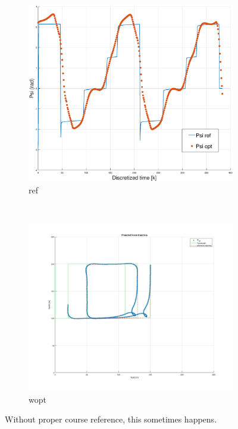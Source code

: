 \clearpage
\begin{figure}[!ht] %
    \centering
    \begin{subfigure}{0.90\textwidth}
        \includegraphics[width=\textwidth]{Images/Figures/Extra_Stuff/WrapTo2Pi_problem_Ref}
        \caption{ref}
    \end{subfigure}
    \hfill
    \\
    \begin{subfigure}{0.90\textwidth}
        \includegraphics[width=\textwidth]{Images/Figures/Extra_Stuff/WrapTo2Pi_problem_Wopt}
        \caption{wopt}
    \end{subfigure}
    \caption{Without proper course reference, this sometimes happens.}
\end{figure}

